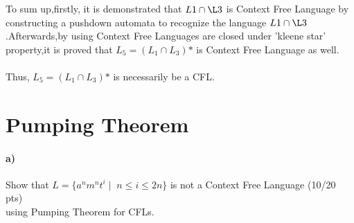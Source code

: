 \documentclass[a4paper,12pt]{article}
\begin{document}
\begin{tcolorbox}
To sum up,firstly, it is demonstrated that $L1 \cap \L3$ is Context Free Language by constructing a pushdown automata to recognize the language $L1 \cap \L3$.Afterwards,by using Context Free Languages are closed under 'kleene star' property,it is proved that $L_5 = (L_1 \cap L_3)\text{*}$ is      
 Context Free Language as well.\\\\
 Thus, $L_5 = (L_1 \cap L_3)\text{*}$ is necessarily be a CFL.\\

\end{tcolorbox}





\newpage
\section{Pumping Theorem \hfill {}}

\paragraph{a)} Show that $L=\{a^n m^n t^i \mid \; n\leq i \leq 2n\}$ is not a Context Free Language \hfill \small{(10/20 pts)} \\
using Pumping Theorem for CFLs. \\
\end{document}

